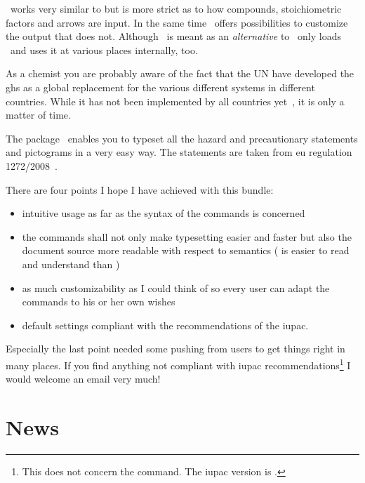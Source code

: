 \documentclass[load-preamble+]{cnltx-doc}
\begin{document}
\chemformula\ works very similar to  but is more strict as to how
compounds, stoichiometric factors and arrows are input.  In the same time
\chemformula\ offers possibilities to customize the output that 
does not.  Although \chemformula\ is meant as an \emph{alternative} to
 \chemmacros\ only loads \chemformula\ and uses it at various
places internally, too.

As a chemist you are probably aware of the fact that the \acl{UN} have
developed the \ac{ghs} as a global replacement for the various different
systems in different countries.  While it has not been implemented by all
countries yet~\cite{unece:ghsystem_implementation}, it is only a matter of
time.

The package \ghsystem\ enables you to typeset all the hazard and precautionary
statements and pictograms in a very easy way.  The statements are taken from
\acs{eu} regulation 1272/2008~\cite{eu:ghsystem_regulation}.

There are four points I hope I have achieved with this bundle:
\begin{itemize}
  \item intuitive usage as far as the syntax of the commands is concerned
  \item the commands shall not only make typesetting easier and faster but also
    the document source more readable with respect to semantics
    ( is easier to read and understand than
    )
  \item as much customizability as I could think of so every user can adapt the
    commands to his or her own wishes
  \item default settings compliant with the recommendations of the \acf{iupac}.
\end{itemize}
Especially the last point needed some pushing from users to get things right
in many places.  If you find anything not compliant with \ac{iupac}
recommendations\footnote{This does not concern the  command. The
  \ac{iupac} version is \sarg.} I would welcome an email very much!

\section{News}
\end{document}
